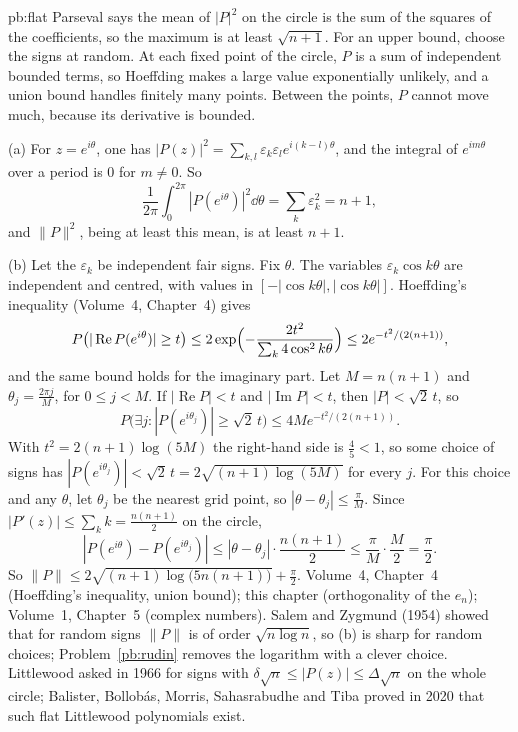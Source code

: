 \begin{solution}{pb:flat}
\idea Parseval says the mean of $|P|^2$ on the circle is the sum of the squares of the coefficients, so the maximum is at least $\sqrt{n+1}$. For an upper bound, choose the signs at random. At each fixed point of the circle, $P$ is a sum of independent bounded terms, so Hoeffding makes a large value exponentially unlikely, and a union bound handles finitely many points. Between the points, $P$ cannot move much, because its derivative is bounded.

\writeup (a) For $z=e^{i\theta}$, one has $|P(z)|^2=\sum_{k,l}\varepsilon_k\varepsilon_le^{i(k-l)\theta}$, and the integral of $e^{im\theta}$ over a period is $0$ for $m\ne0$. So
\[
\frac1{2\pi}\int_0^{2\pi}|P(e^{i\theta})|^2\dd\theta=\sum_k\varepsilon_k^2=n+1,
\]
and $\|P\|^2$, being at least this mean, is at least $n+1$.

(b) Let the $\varepsilon_k$ be independent fair signs. Fix $\theta$. The variables $\varepsilon_k\cos k\theta$ are independent and centred, with values in $[-|\cos k\theta|,|\cos k\theta|]$. Hoeffding's inequality (Volume~4, Chapter~4) gives
\[
P\bigl(|\operatorname{Re}P(e^{i\theta})|\ge t\bigr)\le2\exp\Bigl(-\frac{2t^2}{\sum_k4\cos^2k\theta}\Bigr)\le2e^{-t^2/(2(n+1))},
\]
and the same bound holds for the imaginary part. Let $M=n(n+1)$ and $\theta_j=\frac{2\pi j}M$, for $0\le j<M$. If $|\operatorname{Re}P|<t$ and $|\operatorname{Im}P|<t$, then $|P|<\sqrt2\,t$, so
\[
P\bigl(\exists j:|P(e^{i\theta_j})|\ge\sqrt2\,t\bigr)\le4Me^{-t^2/(2(n+1))}.
\]
With $t^2=2(n+1)\log(5M)$ the right-hand side is $\frac45<1$, so some choice of signs has $|P(e^{i\theta_j})|<\sqrt2\,t=2\sqrt{(n+1)\log(5M)}$ for every $j$. For this choice and any $\theta$, let $\theta_j$ be the nearest grid point, so $|\theta-\theta_j|\le\frac\pi M$. Since $|P'(z)|\le\sum_kk=\frac{n(n+1)}2$ on the circle,
\[
|P(e^{i\theta})-P(e^{i\theta_j})|\le|\theta-\theta_j|\cdot\frac{n(n+1)}2\le\frac\pi M\cdot\frac M2=\frac\pi2.
\]
So $\|P\|\le2\sqrt{(n+1)\log\bigl(5n(n+1)\bigr)}+\frac\pi2$.
\tools Volume~4, Chapter~4 (Hoeffding's inequality, union bound); this chapter (orthogonality of the $e_n$); Volume~1, Chapter~5 (complex numbers).
\leads Salem and Zygmund (1954) showed that for random signs $\|P\|$ is of order $\sqrt{n\log n}$, so (b) is sharp for random
choices; Problem~\ref{pb:rudin} removes the logarithm with a clever choice. Littlewood asked in 1966 for signs with
$\delta\sqrt n\le|P(z)|\le\Delta\sqrt n$ on the whole circle; Balister, Bollob\'as, Morris, Sahasrabudhe and Tiba proved in 2020
that such flat Littlewood polynomials exist.
\end{solution}

